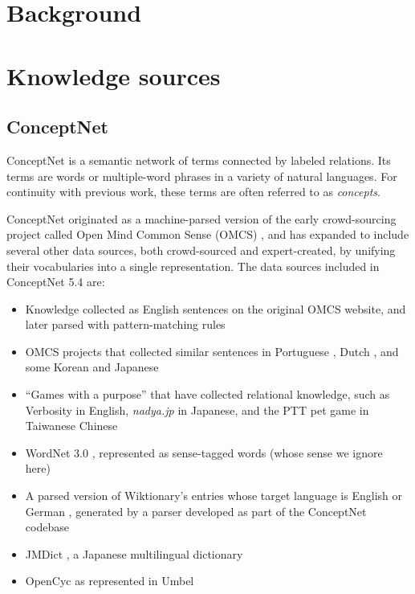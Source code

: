 \documentclass[11pt,letterpaper]{article}
\begin{document}
\section{Background}



\section{Knowledge sources}

\subsection{ConceptNet}
ConceptNet \cite{speer2012conceptnet} is a semantic network of terms
connected by labeled relations. Its terms are words or multiple-word phrases
in a variety of natural languages. For continuity with previous work,
these terms are often referred to as {\em concepts}.

ConceptNet originated as a machine-parsed version of the early crowd-sourcing
project called Open Mind Common Sense (OMCS) \cite{singh2002omcs}, and has expanded
to include several other data sources, both crowd-sourced and expert-created,
by unifying their vocabularies into a single representation.
The data sources included in ConceptNet 5.4 are:

\begin{itemize}
\item Knowledge collected as English sentences on the original OMCS website,
    and later parsed with pattern-matching rules
\item OMCS projects that collected similar sentences in Portuguese
    \cite{anacleto2006portuguese},
    Dutch \cite{eckhardt2008kid}, and some Korean and Japanese
    \cite{chung2006globalmind}
\item ``Games with a purpose'' that have collected relational knowledge, such as
    Verbosity \cite{vonahn2006verbosity} in English, {\em nadya.jp}
    \cite{nakahara2011nadya} in Japanese, and the PTT pet game \cite{kuo2009petgame}
    in Taiwanese Chinese
\item WordNet 3.0 \cite{miller1998wordnet}, represented as sense-tagged words
    (whose sense we ignore here)
\item A parsed version of Wiktionary's entries whose target language is English
      or German \cite{wiktionary2014en} \cite{wiktionary2014de}, generated
      by a parser developed as part of the ConceptNet codebase
\item JMDict \cite{breen2004jmdict}, a Japanese multilingual dictionary
\item OpenCyc \cite{matuszek2006cyc} as represented in Umbel \cite{bergman2008umbel}
\end{itemize}
\end{document}
